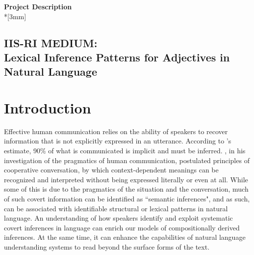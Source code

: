 \documentclass[10pt]{article}
\begin{document}
\begin{center}
{\LARGE{\bf Project Description}}\\*[3mm]
\subsection*{IIS-RI MEDIUM: \\
Lexical Inference Patterns for Adjectives in Natural Language}
\end{center}


\section{Introduction}

%
%

Effective human communication relies on the ability of speakers to recover information that is not explicitly expressed in an utterance. 
According to \cite{graesser1985implicit}'s estimate, 90\% of what is communicated is implicit and must be inferred. \cite{grice1975logic}, in his investigation 
of the pragmatics of human communication, postulated principles of cooperative 
conversation, by which context-dependent meanings can be recognized and interpreted 
without being expressed literally or even at all. 
While some of this is due to the pragmatics of the situation and the conversation, much of such covert information can be identified as ``semantic inferences", and as such, can be associated with identifiable structural or lexical patterns in natural language.
An understanding of how speakers identify and exploit systematic covert inferences in language can enrich our models of compositionally derived inferences. 
At the same time, it can enhance the capabilities of natural language understanding systems to read beyond the surface forms of the text.
\end{document}
